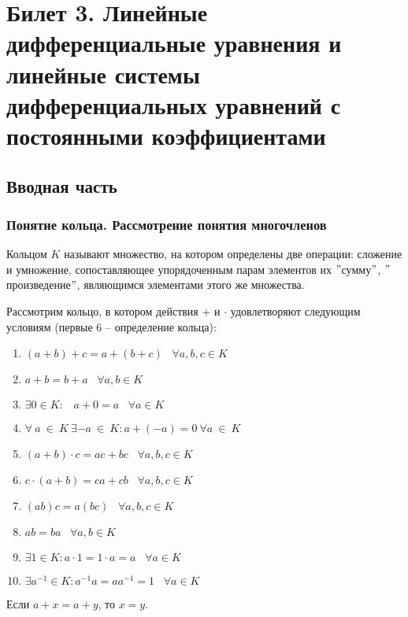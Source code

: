 \section{Билет 3. Линейные дифференциальные уравнения и линейные системы дифференциальных уравнений с постоянными коэффициентами}

\subsection{Вводная часть}
\subsubsection{Понятие кольца. Рассмотрение понятия многочленов}

\begin{definition}
    Кольцом $K$ называют множество, на котором определены две операции: сложение и умножение, сопоставляющее упорядоченным парам элементов их $"$сумму$"$, $"$произведение$"$, являющимся элементами этого же множества.
\end{definition}

Рассмотрим кольцо, в котором действия $+$ и $\cdot$ удовлетворяют следующим условиям (первые $6$ -- определение кольца):
\begin{enumerate}
    \item $(a+b)+c=a+(b+c)\;\;\;\forall a, b, c \in K$
    \item $a+b=b+a\;\;\;\forall a, b\in K$
    \item $\exists 0\in K:\;\;\; a+0=a \;\;\;\forall a\in K$
    \item $\forall ~ a ~ \in ~ K ~ \exists -a ~ \in ~ K: a+(-a)=0 ~ \forall a ~\in ~ K$
    \item $(a+b) \cdot c = ac + bc \;\;\; \forall a, b, c \in K$
    \item $c\cdot(a+b)=ca+cb\;\;\; \forall a, b, c\in K$
    \item $(ab)c=a(bc)\;\;\; \forall a, b, c\in K$
    \item $ab=ba \;\;\;\forall a, b\in K$
    \item $\exists 1\in K: a\cdot 1 =1\cdot a = a\;\;\;\forall a\in K$
    \item $\exists a^{-1} \in K: a^{-1}a=aa^{-1}=1\;\;\;\forall a\in K$
\end{enumerate}

\begin{proposition}
    Если $a+x=a+y$, то $x=y$.
\end{proposition}

